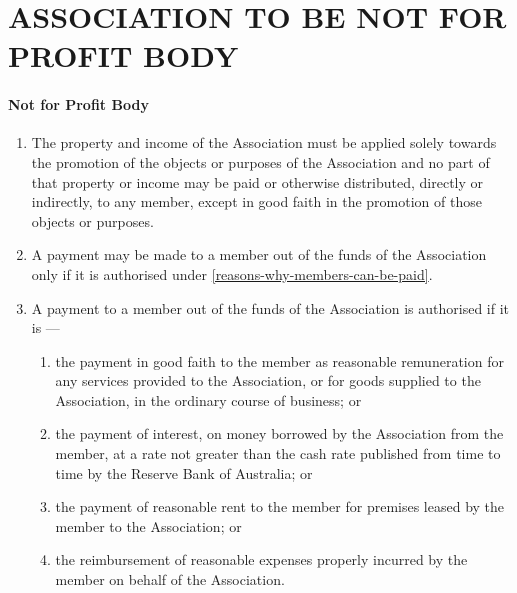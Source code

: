 \documentclass[../constitution.tex]{subfiles}
\begin{document}
\part{ASSOCIATION TO BE NOT FOR PROFIT BODY} \label{part-2-association-to-be-not-for-profit-body}


\subsection{Not for Profit Body} \label{not-for-profit-body} 

\begin{enumerate}

\item The property and income of the Association must be applied solely towards the promotion of the objects or purposes of the Association and no part of that property or income may be paid or otherwise distributed, directly or indirectly, to any member, except in good faith in the promotion of those objects or purposes.
\item A payment may be made to a member out of the funds of the Association only if it is authorised under  \ref{reasons-why-members-can-be-paid}.
\item A payment to a member out of the funds of the Association is authorised if it is ---

  \begin{enumerate} \label{reasons-why-members-can-be-paid}
  \item the payment in good faith to the member as reasonable remuneration for any services provided to the Association, or for goods supplied to the Association, in the ordinary course of business; or
  \item the payment of interest, on money borrowed by the Association from the member, at a rate not greater than the cash rate published from time to time by the Reserve Bank of Australia; or
  \item the payment of reasonable rent to the member for premises leased by the member to the Association; or
  \item the reimbursement of reasonable expenses properly incurred by the member on behalf of the Association.
  \end{enumerate}
\end{enumerate}

\end{document}
